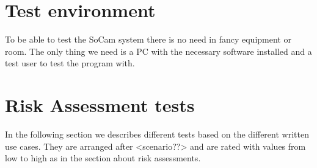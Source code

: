 	\section {Test environment}

	To be able to test the SoCam system there is no need in fancy equipment or room. The only thing we need 
	is a PC with the necessary software installed and a test user to test the program with.

	\section {Risk Assessment tests}

	In the following section we describes different tests based on the different written use cases. 
	They are arranged after <scenario??> and are rated with values from low to high as in the section 
	about risk assessments. 


